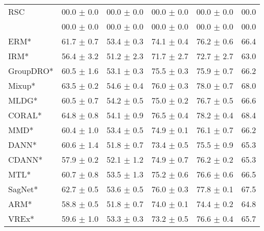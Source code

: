 \begin{table*}
\begin{center}
\begin{tabular}{lccccc}
RSC                  & 00.0 $\pm$ 0.0       & 00.0 $\pm$ 0.0        & 00.0 $\pm$ 0.0       & 00.0 $\pm$ 0.0        & 00.0                 \\
\divcams 	   & 00.0 $\pm$ 0.0       & 00.0 $\pm$ 0.0        & 00.0 $\pm$ 0.0       & 00.0 $\pm$ 0.0        & 00.0                 \\
\midrule
ERM*                  & 61.7 $\pm$ 0.7       & 53.4 $\pm$ 0.3       & 74.1 $\pm$ 0.4       & 76.2 $\pm$ 0.6       & 66.4                 \\
IRM*                  & 56.4 $\pm$ 3.2       & 51.2 $\pm$ 2.3       & 71.7 $\pm$ 2.7       & 72.7 $\pm$ 2.7       & 63.0                 \\
GroupDRO*             & 60.5 $\pm$ 1.6       & 53.1 $\pm$ 0.3       & 75.5 $\pm$ 0.3       & 75.9 $\pm$ 0.7       & 66.2                 \\
Mixup*                & 63.5 $\pm$ 0.2       & 54.6 $\pm$ 0.4       & 76.0 $\pm$ 0.3       & 78.0 $\pm$ 0.7       & 68.0                 \\
MLDG*                 & 60.5 $\pm$ 0.7       & 54.2 $\pm$ 0.5       & 75.0 $\pm$ 0.2       & 76.7 $\pm$ 0.5       & 66.6                 \\
CORAL*                & 64.8 $\pm$ 0.8       & 54.1 $\pm$ 0.9       & 76.5 $\pm$ 0.4       & 78.2 $\pm$ 0.4       & 68.4                 \\
MMD*                  & 60.4 $\pm$ 1.0       & 53.4 $\pm$ 0.5       & 74.9 $\pm$ 0.1       & 76.1 $\pm$ 0.7       & 66.2                 \\
DANN*                 & 60.6 $\pm$ 1.4       & 51.8 $\pm$ 0.7       & 73.4 $\pm$ 0.5       & 75.5 $\pm$ 0.9       & 65.3                 \\
CDANN*                & 57.9 $\pm$ 0.2       & 52.1 $\pm$ 1.2       & 74.9 $\pm$ 0.7       & 76.2 $\pm$ 0.2       & 65.3                 \\
MTL*                  & 60.7 $\pm$ 0.8       & 53.5 $\pm$ 1.3       & 75.2 $\pm$ 0.6       & 76.6 $\pm$ 0.6       & 66.5                 \\
SagNet*               & 62.7 $\pm$ 0.5       & 53.6 $\pm$ 0.5       & 76.0 $\pm$ 0.3       & 77.8 $\pm$ 0.1       & 67.5                 \\
ARM*                  & 58.8 $\pm$ 0.5       & 51.8 $\pm$ 0.7       & 74.0 $\pm$ 0.1       & 74.4 $\pm$ 0.2       & 64.8                 \\
VREx*                 & 59.6 $\pm$ 1.0       & 53.3 $\pm$ 0.3       & 73.2 $\pm$ 0.5       & 76.6 $\pm$ 0.4       & 65.7                 \\

\end{tabular}
\end{center}
\end{table*}
